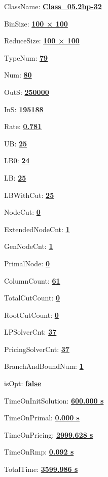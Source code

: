 \documentclass[11pt]{article}
\begin{document}
\pagestyle{empty}


ClassName: \underline{\textbf{Class_05.2bp-32}}
\par
BinSize: \underline{\textbf{100 × 100}}
\par
ReduceSize: \underline{\textbf{100 × 100}}
\par
TypeNum: \underline{\textbf{79}}
\par
Num: \underline{\textbf{80}}
\par
OutS: \underline{\textbf{250000}}
\par
InS: \underline{\textbf{195188}}
\par
Rate: \underline{\textbf{0.781}}
\par
UB: \underline{\textbf{25}}
\par
LB0: \underline{\textbf{24}}
\par
LB: \underline{\textbf{25}}
\par
LBWithCut: \underline{\textbf{25}}
\par
NodeCut: \underline{\textbf{0}}
\par
ExtendedNodeCnt: \underline{\textbf{1}}
\par
GenNodeCnt: \underline{\textbf{1}}
\par
PrimalNode: \underline{\textbf{0}}
\par
ColumnCount: \underline{\textbf{61}}
\par
TotalCutCount: \underline{\textbf{0}}
\par
RootCutCount: \underline{\textbf{0}}
\par
LPSolverCnt: \underline{\textbf{37}}
\par
PricingSolverCnt: \underline{\textbf{37}}
\par
BranchAndBoundNum: \underline{\textbf{1}}
\par
isOpt: \underline{\textbf{false}}
\par
TimeOnInitSolution: \underline{\textbf{600.000 s}}
\par
TimeOnPrimal: \underline{\textbf{0.000 s}}
\par
TimeOnPricing: \underline{\textbf{2999.628 s}}
\par
TimeOnRmp: \underline{\textbf{0.092 s}}
\par
TotalTime: \underline{\textbf{3599.986 s}}
\par
\newpage


\end{document}

